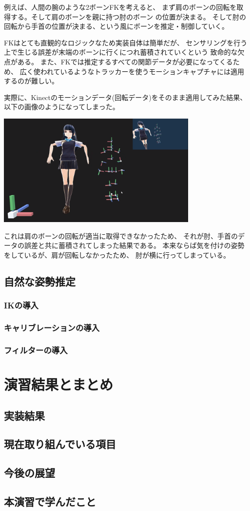 \documentclass[a4j]{jsarticle}
\begin{document}
例えば、人間の腕のような2ボーンFKを考えると、
まず肩のボーンの回転を取得する。そして肩のボーンを親に持つ肘のボーン
の位置が決まる。
そして肘の回転から手首の位置が決まる、という風にボーンを推定・制御していく。

FKはとても直観的なロジックなため実装自体は簡単だが、
センサリングを行う上で生じる誤差が末端のボーンに行くにつれ蓄積されていくという
致命的な欠点がある。
また、FKでは推定するすべての関節データが必要になってくるため、
広く使われているようなトラッカーを使うモーションキャプチャには適用するのが難しい。

実際に、Kinectのモーションデータ(回転データ)をそのまま適用してみた結果、
以下の画像のようになってしまった。

\includegraphics[width=10cm]{img/fk-noise}

これは肩のボーンの回転が適当に取得できなかったため、
それが肘、手首のデータの誤差と共に蓄積されてしまった結果である。
本来ならば気を付けの姿勢をしているが、肩が回転しなかったため、
肘が横に行ってしまっている。


\subsection{自然な姿勢推定}

\subsubsection{IKの導入}

\subsubsection{キャリブレーションの導入}

\subsubsection{フィルターの導入}

\section{演習結果とまとめ}

\subsection{実装結果}

\subsection{現在取り組んでいる項目}

\subsection{今後の展望}

\subsection{本演習で学んだこと}
\end{document}
